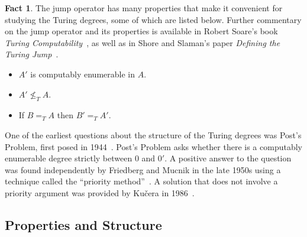 \documentclass[psamsfonts]{amsart}
\newtheorem{prob}[thm]{Problem}
\theoremstyle{definition}
\newtheorem{fact}[thm]{Fact}
\theoremstyle{remark}
\numberwithin{equation}{section}
\begin{document}
\begin{fact}
  The jump operator has many properties that make it convenient for studying the
Turing degrees, some of which are listed below. Further commentary on the jump operator
and its properties is available in Robert Soare's book \emph{Turing
  Computability}~\cite{soare16_turin_comput}, as well as in Shore and Slaman's
paper \emph{Defining the Turing Jump}~\cite{shore99:_defin_turin_jump}.
  \begin{itemize}
  \item $A'$ is computably enumerable in $A$.
  \item $A' \not\leq_T A$.
  \item If $B=_TA$ then $B'=_TA'$.
  \end{itemize}
\end{fact}

One of the earliest questions about the structure of the Turing degrees was
Post's Problem, first posed in 1944~\cite{post44:_recur}. Post's Problem asks
whether there is a computably enumerable degree strictly between $0$ and $0'$. A
positive answer to the question was found independently by Friedberg and Mucnik in the late
1950s using a technique called the ``priority method''~\cite{Friedberg236,
  muchnik1956unsolvability}. A solution that does not involve a priority
argument was provided by Ku\v{c}era in 1986~\cite{Kucera:1986:APS:22416.22462}.


\subsection{Properties and Structure}
\end{document}
